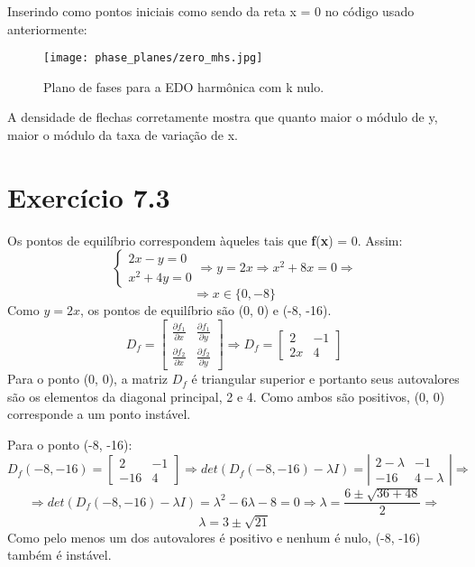 \documentclass{article}[twocolumn]
\begin{document}
	Inserindo como pontos iniciais como sendo da reta x = 0 no c\'odigo usado anteriormente:
	\begin{figure}[H]
		\centering
		\texttt{[image: phase\_planes/zero\_mhs.jpg]}
		\caption{Plano de fases para a EDO harm\^onica com k nulo.}
	\end{figure}
	A densidade de flechas corretamente mostra que quanto maior o m\'odulo de y,
	maior o m\'odulo da taxa de varia\c{c}\~ao de x.
	\section{Exerc\'icio 7.3}
	Os pontos de equil\'ibrio correspondem \`aqueles tais que \textbf{f}(\textbf{x}) = 0.
	Assim:
	\begin{equation}
		\left\{\begin{array}{c}
			2x - y = 0\\
			x^2 + 4y = 0
		\end{array}\right. \Rightarrow
		y = 2x \Rightarrow x^2 + 8x = 0 \Rightarrow
		\nonumber
	\end{equation}
	\begin{equation}
		\Rightarrow x \in \{0, -8\}
		\nonumber
	\end{equation}
	Como $y = 2x$, os pontos de equil\'ibrio s\~ao (0, 0) e (-8, -16).
	\begin{equation}
		D_f = \left[\begin{array}{cc}
			\frac{\partial f_1}{\partial x} & \frac{\partial f_1}{\partial y}\\
			\frac{\partial f_2}{\partial x} & \frac{\partial f_2}{\partial y}
		\end{array}\right] \Rightarrow
		D_f = \left[\begin{array}{cc}
			2 & -1\\
			2x & 4
		\end{array}\right]
		\nonumber
	\end{equation}
	Para o ponto (0, 0), a matriz $D_f$ \'e triangular superior e portanto seus
	autovalores s\~ao os elementos da diagonal principal, 2 e 4. Como ambos s\~ao
	positivos, (0, 0) corresponde a um ponto inst\'avel.

	Para o ponto (-8, -16):
	\begin{equation}
		D_f(-8, -16) = \left[\begin{array}{cc}
			2 & -1\\
			-16 & 4
		\end{array}\right] \Rightarrow
		det(D_f(-8, -16) - \lambda I) = \left|\begin{array}{cc}
			2 - \lambda & -1\\
			-16 & 4 - \lambda
		\end{array}\right| \Rightarrow
		\nonumber
	\end{equation}
	\begin{equation}
		\Rightarrow det(D_f(-8, -16) - \lambda I) = \lambda^2 - 6\lambda - 8 = 0
		\Rightarrow \lambda = \frac{6 \pm \sqrt{36 + 48}}{2} \Rightarrow
		\nonumber
	\end{equation}
	\begin{equation}
		\lambda = 3 \pm \sqrt{21}
		\nonumber
	\end{equation}
	Como pelo menos um dos autovalores \'e positivo e nenhum \'e nulo, (-8, -16)
	tamb\'em \'e inst\'avel.
\end{document}
